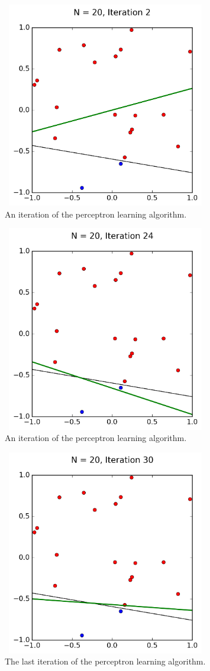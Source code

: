 \documentclass[a4paper]{article}
\begin{document}
\begin{figure}
  \includegraphics[width=9cm,height=9cm]{p_N20_it2.png}
  \caption{An iteration of the perceptron learning algorithm.}
  \label{fig:PartB1}
\end{figure}
\begin{figure}
  \includegraphics[width=9cm,height=9cm]{p_N20_it24.png}
  \caption{An iteration of the perceptron learning algorithm.}
  \label{fig:PartB2}
\end{figure}
\begin{figure}
  \includegraphics[width=9cm,height=9cm]{p_N20_it30.png}
  \caption{The last iteration of the perceptron learning algorithm.}
  \label{fig:PartB3}
\end{figure}
\end{document}
